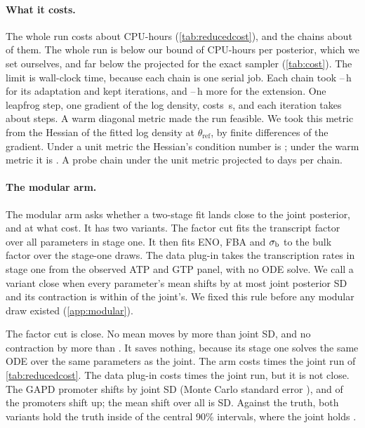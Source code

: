 \paragraph{What it costs.} The whole run costs about  CPU-hours
(\cref{tab:reducedcost}), and the chains about  of them. The whole run is below
our bound of  CPU-hours per posterior, which we set ourselves, and far below the  projected for the exact sampler (\cref{tab:cost}).
The limit is wall-clock time, because each chain is one serial job. Each chain took
--\,h for its  adaptation
and  kept iterations, and --\,h
more for the extension. One leapfrog step, one gradient of the log density, costs
\,s, and each iteration takes about  steps. A warm diagonal
metric made the run feasible. We took this metric from the Hessian of the fitted log
density at $\theta_{\mathrm{ref}}$, by finite differences of the gradient. Under a unit metric the Hessian's condition number is
; under the warm metric it is . A probe chain
under the unit metric projected to  days per chain.

\paragraph{The modular arm.} The modular arm asks whether a two-stage fit lands close to
the joint posterior, and at what cost. It has two variants. The factor cut fits the
transcript factor over all  parameters in stage one. It then fits ENO, FBA
and $\sigma_{\mathrm{b}}$ to the bulk factor over the stage-one draws. The data plug-in takes the
transcription rates in stage one from the observed ATP and GTP panel, with no ODE solve. We
call a variant close when every parameter's mean shifts by at most 
joint posterior SD and its contraction is within  of the joint's. We
fixed this rule before any modular draw existed (\cref{app:modular}).

The factor cut is close. No mean moves by more than  joint SD, and no
contraction by more than . It saves nothing, because its stage one
solves the same ODE over the same parameters as the joint. The arm costs
 times the joint run of \cref{tab:reducedcost}. The data plug-in costs
 times the joint run, but it is not close. The GAPD promoter
shifts by  joint SD (Monte Carlo standard error ), and
 of the  promoters shift up; the mean shift over all
 is  SD. Against the truth, both variants hold the truth inside  of the
 central 90\% intervals, where the joint holds .

